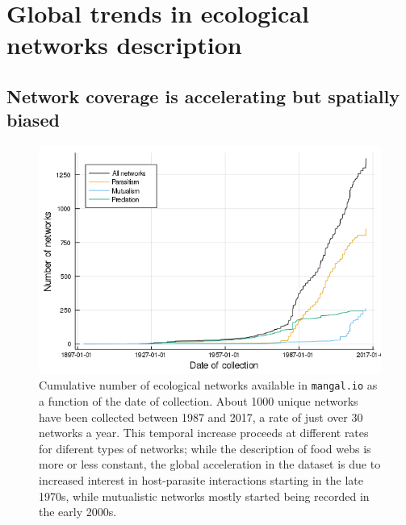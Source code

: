 \hypertarget{global-trends-in-ecological-networks-description}{%
\section{Global trends in ecological networks
description}\label{global-trends-in-ecological-networks-description}}

\hypertarget{network-coverage-is-accelerating-but-spatially-biased}{%
\subsection{Network coverage is accelerating but spatially
biased}\label{network-coverage-is-accelerating-but-spatially-biased}}

\begin{figure}
\centering
\includegraphics{figures/figure_01_a.png}
\caption{Cumulative number of ecological networks available in
\texttt{mangal.io} as a function of the date of collection. About 1000
unique networks have been collected between 1987 and 2017, a rate of
just over 30 networks a year. This temporal increase proceeds at
different rates for diferent types of networks; while the description of
food webs is more or less constant, the global acceleration in the
dataset is due to increased interest in host-parasite interactions
starting in the late 1970s, while mutualistic networks mostly started
being recorded in the early 2000s.\label{fig:temporal}}
\end{figure}


